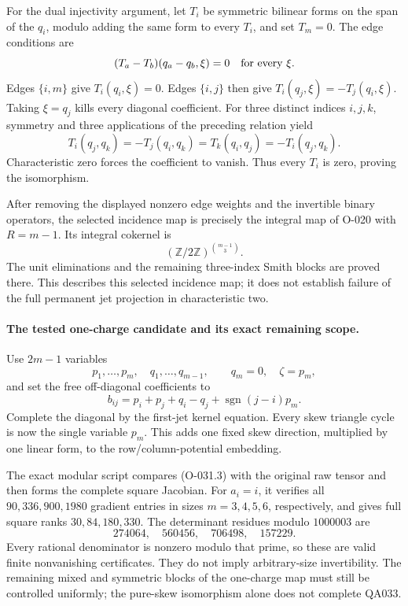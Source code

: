 For the dual injectivity argument, let \(T_i\) be
symmetric bilinear forms on the span of the \(q_i\),
modulo adding the same form to every \(T_i\), and set
\(T_m=0\). The edge conditions are
\[
               (T_a-T_b)(q_a-q_b,\xi)=0
                              \quad\hbox{for every }\xi.
\]
Edges \(\{i,m\}\) give \(T_i(q_i,\xi)=0\).
Edges \(\{i,j\}\) then give
\(T_i(q_j,\xi)=-T_j(q_i,\xi)\).
Taking \(\xi=q_j\) kills every diagonal coefficient.
For three distinct indices \(i,j,k\), symmetry and
three applications of the preceding relation yield
\[
 T_i(q_j,q_k)=-T_j(q_i,q_k)
             =T_k(q_i,q_j)=-T_i(q_j,q_k).
\]
Characteristic zero forces the coefficient to vanish.
Thus every \(T_i\) is zero, proving the isomorphism.

After removing the displayed nonzero edge weights
and the invertible binary operators, the selected
incidence map is precisely the integral map of O-020
with \(R=m-1\). Its integral cokernel is
\[
             (\mathbb Z/2\mathbb Z)^{\binom{m-1}{3}}.
\]
The unit eliminations and the remaining three-index
Smith blocks are proved there. This describes this
selected incidence map; it does not establish failure
of the full permanent jet projection in characteristic
two.

\paragraph{The tested one-charge candidate and its exact remaining scope.}
Use \(2m-1\) variables
\[
       p_1,\ldots,p_m,\quad q_1,\ldots,q_{m-1},
                         \qquad q_m=0,\quad\zeta=p_m,
\]
and set the free off-diagonal coefficients to
\[
             b_{ij}=p_i+p_j+q_i-q_j
                                +\operatorname{sgn}(j-i)p_m.
                                                               \tag{O-031.7}
\]
Complete the diagonal by the first-jet kernel equation.
Every skew triangle cycle is now the single variable
\(p_m\). This adds one fixed skew direction, multiplied
by one linear form, to the row/column-potential embedding.

The exact modular script
compares (O-031.3) with the original raw tensor and
then forms the complete square Jacobian.
For \(a_i=i\), it verifies all
\(90,336,900,1980\) gradient entries in sizes
\(m=3,4,5,6\), respectively, and gives full square
ranks \(30,84,180,330\).
The determinant residues modulo \(1000003\) are
\[
                       274064,\quad560456,\quad706498,\quad157229.
\]
Every rational denominator is nonzero modulo that
prime, so these are valid finite nonvanishing
certificates. They do not imply arbitrary-size
invertibility. The remaining mixed and symmetric
blocks of the one-charge map must still be controlled
uniformly; the pure-skew isomorphism alone does not
complete QA033.

